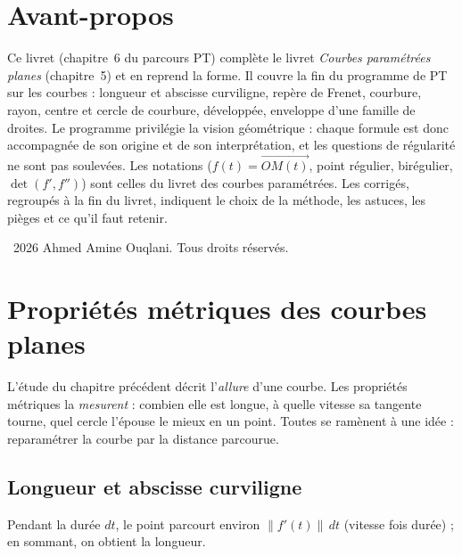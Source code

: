 \documentclass[a4paper,11pt]{article}
\numberwithin{equation}{section}
\numberwithin{figure}{section}
\numberwithin{table}{section}
\theoremstyle{enonce}
\theoremstyle{exemple}
\theoremstyle{remarque}
\newcommand{\vv}[1]{\overrightarrow{#1}}
\newif\ifonglets \ongletsfalse
\begin{document}
\thispagestyle{plain}
\section*{Avant-propos}

Ce livret (chapitre~6 du parcours PT) complète le livret \emph{Courbes paramétrées planes} (chapitre~5) et en reprend la forme. Il couvre la fin du programme de PT
sur les courbes : longueur et abscisse curviligne, repère de Frenet, courbure, rayon, centre et cercle de courbure, développée,
enveloppe d'une famille de droites. Le programme privilégie la vision géométrique : chaque formule est donc accompagnée de
son origine et de son interprétation, et les questions de régularité ne sont pas soulevées. Les notations ($f(t)=\vv{OM(t)}$,
point régulier, birégulier, $\det(f',f'')$) sont celles du livret des courbes paramétrées. Les corrigés, regroupés à la fin du livret, indiquent le
choix de la méthode, les astuces, les pièges et ce qu'il faut retenir.

\vfill
{\footnotesize\sffamily\color{Gris}\textcopyright~2026 Ahmed Amine Ouqlani. Tous droits réservés.\par}

\clearpage
\thispagestyle{plain}
\hypertarget{toc}{}
\renewcommand{\contentsname}{Sommaire}
\tableofcontents
\clearpage
{}
\ongletstrue
\clearpage
\section{Propriétés métriques des courbes planes}

L'étude du chapitre précédent décrit l'\emph{allure} d'une courbe. Les propriétés métriques la \emph{mesurent} : combien elle est
longue, à quelle vitesse sa tangente tourne, quel cercle l'épouse le mieux en un point. Toutes se ramènent à une idée :
reparamétrer la courbe par la distance parcourue.

\subsection{Longueur et abscisse curviligne}

Pendant la durée $dt$, le point parcourt environ $\|f'(t)\|\,dt$ (vitesse fois durée) ; en sommant, on obtient la longueur.
\end{document}
